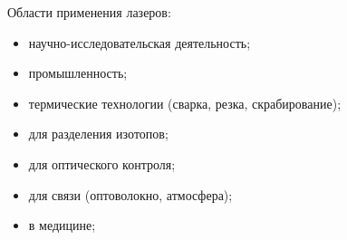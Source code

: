 Области применения лазеров:
\begin{itemize}
    \item научно-исследовательская деятельность;
    \item промышленность;
    \item термические технологии (сварка, резка, скрабирование);
    \item для разделения изотопов;
    \item для оптического контроля;
    \item для связи (оптоволокно, атмосфера);
    \item в медицине;
\end{itemize}

